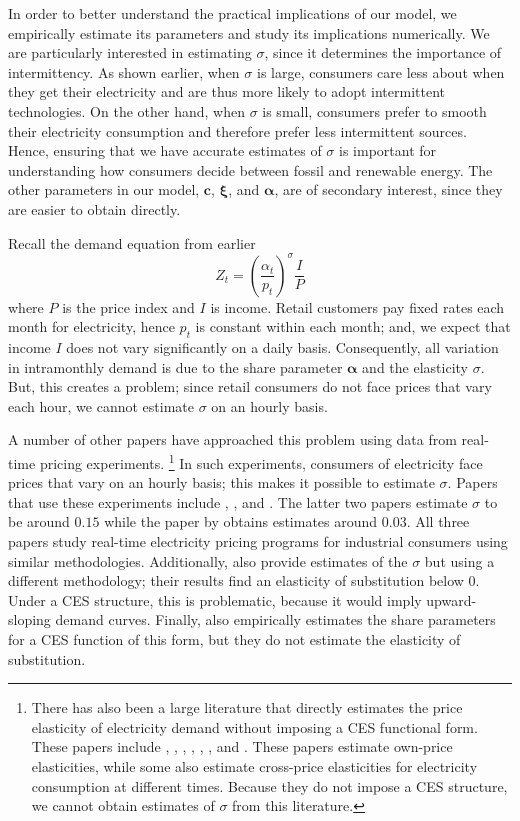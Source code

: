 \documentclass[11pt,a4paper,leqno]{extarticle}
\begin{document}
	In order to better understand the practical implications of our model, we empirically estimate its parameters and study its implications numerically. We are particularly interested in estimating $\sigma$, since it determines the importance of intermittency. As shown earlier, when $\sigma$ is large, consumers care less about when they get their electricity and are thus more likely to adopt intermittent technologies. On the other hand, when $\sigma$ is small, consumers prefer to smooth their electricity consumption and therefore prefer less intermittent sources. Hence, ensuring that we have accurate estimates of $\sigma$ is important for understanding how consumers decide between fossil and renewable energy. The other parameters in our model, $\mathbf{c}$,  $\boldsymbol{\xi}$, and $\boldsymbol{\alpha}$, are of secondary interest, since they are easier to obtain directly. 
	
	Recall the demand equation from earlier
	\begin{equation}
	Z_t = \left(\frac{\alpha_t}{p_t} \right)^\sigma \frac{I}{P}
	\end{equation}
	where $P$ is the price index and $I$ is income. Retail customers pay fixed rates each month for electricity, hence $p_t$ is constant within each month; and, we expect that income $I$ does not vary significantly on a daily basis. Consequently, all variation in intramonthly demand is due to the share parameter $\boldsymbol{\alpha}$ and the elasticity $\sigma$. But, this creates a problem; since retail consumers do not face prices that vary each hour, we cannot estimate  $\sigma$ on an hourly basis. 
	
	A number of other papers have approached this problem using data from real-time pricing experiments.
	\footnote{ There has also been a large literature that directly estimates the price elasticity of electricity demand without imposing a CES functional form. These papers include \citet{Wolak}, \citet{Zarnikau}, \citet{Woo}, \citet{Zhou}, \citet{Reiss}, \citet{Fan}, and \citet{Deryugina}. These papers estimate own-price elasticities, while some also estimate cross-price elasticities for electricity consumption at different times. Because they do not impose a CES structure, we cannot obtain estimates of $\sigma$ from this literature. } In such experiments, consumers of electricity face prices that vary on an hourly basis; this makes it possible to estimate $\sigma$. Papers that use these experiments include \citet{Schwarz}, \citet{Herriges}, and \citet{KS1994}.
	The latter two papers estimate $\sigma$ to be around $0.15$ while the paper by \citeauthor{Schwarz}  obtains estimates around $0.03$. All three papers study real-time electricity pricing programs for industrial consumers using similar methodologies. Additionally, \citet{Aubin} also provide estimates of the $\sigma$ but using a different methodology; their results find an elasticity of substitution below 0. Under a CES structure, this is problematic, because it would imply upward-sloping demand curves. Finally, \citet{Moha2016} also empirically estimates the share parameters for a CES function of this form, but they do not estimate the elasticity of substitution. 
	
\end{document}
